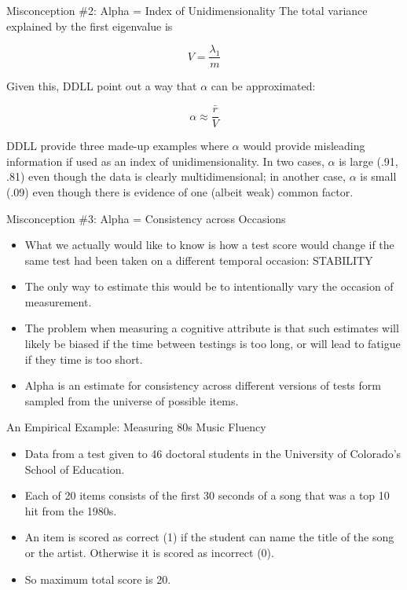 \documentclass[
  ignorenonframetext,
]{beamer}
\providecommand{\tightlist}{%
  \setlength{\itemsep}{0pt}\setlength{\parskip}{0pt}}
\begin{document}
\begin{frame}{Misconception \#2: Alpha = Index of Unidimensionality}
\protect\hypertarget{misconception-2-alpha-index-of-unidimensionality-1}{}
The total variance explained by the first eigenvalue is

\[V=\frac{\lambda_1}{m}\]

Given this, DDLL point out a way that \(\alpha\) can be approximated:

\[\tag{12}\alpha \approx \frac{\bar{r}}{V}\]

DDLL provide three made-up examples where \(\alpha\) would provide
misleading information if used as an index of unidimensionality. In two
cases, \(\alpha\) is large (.91, .81) even though the data is clearly
multidimensional; in another case, \(\alpha\) is small (.09) even though
there is evidence of one (albeit weak) common factor.
\end{frame}

\begin{frame}{Misconception \#3: Alpha = Consistency across Occasions}
\protect\hypertarget{misconception-3-alpha-consistency-across-occasions}{}
\begin{itemize}
\item
  What we actually would like to know is how a test score would change
  if the same test had been taken on a different temporal occasion:
  STABILITY
\item
  The only way to estimate this would be to intentionally vary the
  occasion of measurement.
\item
  The problem when measuring a cognitive attribute is that such
  estimates will likely be biased if the time between testings is too
  long, or will lead to fatigue if they time is too short.
\item
  Alpha is an estimate for consistency across different versions of
  tests form sampled from the universe of possible items.
\end{itemize}
\end{frame}

\begin{frame}{An Empirical Example: Measuring 80s Music Fluency}
\protect\hypertarget{an-empirical-example-measuring-80s-music-fluency}{}
\begin{itemize}
\tightlist
\item
  Data from a test given to 46 doctoral students in the University of
  Colorado's School of Education.
\item
  Each of 20 items consists of the first 30 seconds of a song that was a
  top 10 hit from the 1980s.
\item
  An item is scored as correct (1) if the student can name the title of
  the song or the artist. Otherwise it is scored as incorrect (0).
\item
  So maximum total score is 20.
\end{itemize}
\end{frame}
\end{document}
